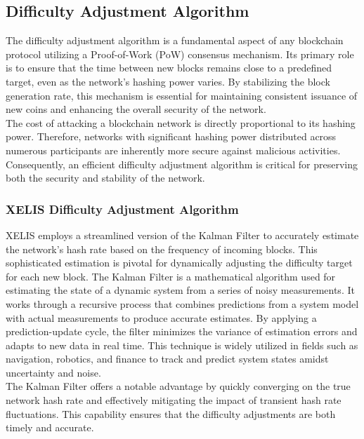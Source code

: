 \documentclass[12pt,a4paper,twocolumn]{article}
\begin{document}
\subsection{Difficulty Adjustment Algorithm}

The difficulty adjustment algorithm is a fundamental aspect of any blockchain protocol utilizing a Proof-of-Work (PoW) consensus mechanism. Its primary role is to ensure that the time between new blocks remains close to a predefined target, even as the network’s hashing power varies. By stabilizing the block generation rate, this mechanism is essential for maintaining consistent issuance of new coins and enhancing the overall security of the network.\\

The cost of attacking a blockchain network is directly proportional to its hashing power. Therefore, networks with significant hashing power distributed across numerous participants are inherently more secure against malicious activities. Consequently, an efficient difficulty adjustment algorithm is critical for preserving both the security and stability of the network.\\

\subsubsection{XELIS Difficulty Adjustment Algorithm}

XELIS employs a streamlined version of the Kalman Filter to accurately estimate the network’s hash rate based on the frequency of incoming blocks. This sophisticated estimation is pivotal for dynamically adjusting the difficulty target for each new block. The Kalman Filter is a mathematical algorithm used for estimating the state of a dynamic system from a series of noisy measurements. It works through a recursive process that combines predictions from a system model with actual measurements to produce accurate estimates. By applying a prediction-update cycle, the filter minimizes the variance of estimation errors and adapts to new data in real time. This technique is widely utilized in fields such as navigation, robotics, and finance to track and predict system states amidst uncertainty and noise.\\

The Kalman Filter offers a notable advantage by quickly converging on the true network hash rate and effectively mitigating the impact of transient hash rate fluctuations. This capability ensures that the difficulty adjustments are both timely and accurate.\\
\end{document}
